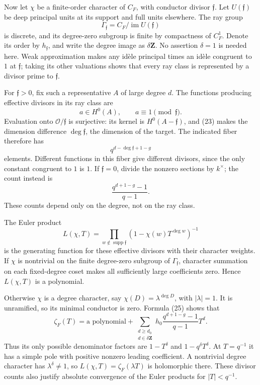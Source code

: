\documentclass[11pt,a4paper]{article}
\begin{document}
Now let \(\chi\) be a finite-order character of \(C_F\), with conductor
divisor \(\mathfrak f\). Let \(U(\mathfrak f)\) be deep principal units
at its support and full units elsewhere. The ray group \[
\Gamma_{\mathfrak f}=C_F/\operatorname{im}U(\mathfrak f)
\] is discrete, and its degree-zero subgroup is finite by compactness of
\(C_F^1\). Denote its order by \(h_{\mathfrak f}\), and write the degree
image as \(\delta\mathbf Z\). No assertion \(\delta=1\) is needed here.
Weak approximation makes any idèle principal times an idèle congruent to
\(1\) at \(\mathfrak f\); taking its other valuations shows that every
ray class is represented by a divisor prime to \(\mathfrak f\).

For \(\mathfrak f>0\), fix such a representative \(A\) of large degree
\(d\). The functions producing effective divisors in its ray class are
\[
a\in H^0(A),\qquad a\equiv1\pmod{\mathfrak f}.
\] Evaluation onto \(\mathcal O/\mathfrak f\) is surjective: its kernel
is \(H^0(A-\mathfrak f)\), and (23) makes the dimension difference
\(\deg\mathfrak f\), the dimension of the target. The indicated fiber
therefore has \[
q^{d-\deg\mathfrak f+1-g}
\tag{24}
\] elements. Different functions in this fiber give different divisors,
since the only constant congruent to \(1\) is \(1\). If
\(\mathfrak f=0\), divide the nonzero sections by \(k^\times\); the
count instead is \[
\frac{q^{d+1-g}-1}{q-1}.
\tag{25}
\] These counts depend only on the degree, not on the ray class.

The Euler product \[
L(\chi,T)=\prod_{w\notin\operatorname{supp}\mathfrak f}
(1-\chi(w)T^{\deg w})^{-1}
\tag{26}
\] is the generating function for these effective divisors with their
character weights. If \(\chi\) is nontrivial on the finite degree-zero
subgroup of \(\Gamma_{\mathfrak f}\), character summation on each
fixed-degree coset makes all sufficiently large coefficients zero. Hence
\(L(\chi,T)\) is a polynomial.

Otherwise \(\chi\) is a degree character, say
\(\chi(D)=\lambda^{\deg D}\), with \(|\lambda|=1\). It is unramified, so
its minimal conductor is zero. Formula (25) shows that \[
\zeta_F(T)
=\text{a polynomial}+
\sum_{\substack{d\geq d_0\\d\in\delta\mathbf Z}}
h_0\frac{q^{d+1-g}-1}{q-1}T^d.
\tag{27}
\] Thus its only possible denominator factors are \(1-T^\delta\) and
\(1-q^\delta T^\delta\). At \(T=q^{-1}\) it has a simple pole with
positive nonzero leading coefficient. A nontrivial degree character has
\(\lambda^\delta\ne1\), so \(L(\chi,T)=\zeta_F(\lambda T)\) is
holomorphic there. These divisor counts also justify absolute
convergence of the Euler products for \(|T|<q^{-1}\).
\end{document}
